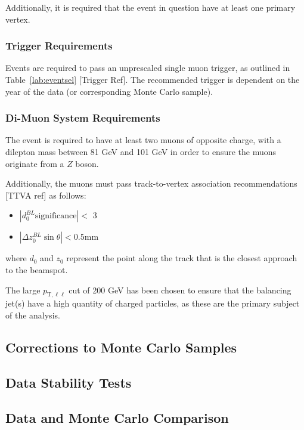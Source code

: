 Additionally, it is required that the event in question have at least one primary vertex.

\subsubsection{Trigger Requirements}
Events are required to pass an unprescaled single muon trigger, as outlined in Table~\ref{lab:eventsel} [Trigger Ref]. The recommended trigger is dependent on the year of the data (or corresponding Monte Carlo sample).

\subsubsection{Di-Muon System Requirements}
The event is required to have at least two muons of opposite charge, with a dilepton mass between 81 GeV and 101 GeV in order to ensure the muons originate from a $Z$ boson.

Additionally, the muons must pass track-to-vertex association recommendations [TTVA ref] as follows:

\begin{itemize}
    \item $|d_0^{BL}\text{significance}| < $ 3
    \item $|\Delta z_0^{BL}\sin\theta| < 0.5 $mm
\end{itemize}

where $d_0$ and $z_0$ represent the point along the track that is the closest approach to the beamspot.

The large $p_{\text{T},\ell\ell}$ cut of 200 GeV has been chosen to ensure that the balancing jet(s) have a high quantity of charged particles, as these are the primary subject of the analysis.

\subsection{Corrections to Monte Carlo Samples}

\subsection{Data Stability Tests}

\subsection{Data and Monte Carlo Comparison}
